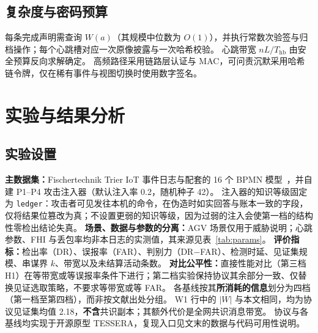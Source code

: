 \documentclass[manuscript,screen,review]{acmart}
\begin{document}
\subsection{复杂度与密码预算}
\label{sec:budget_eng}

每条完成声明需查询 $W(a)$（其规模中位数为 $O(1)$），并执行常数次验签与归档操作；每个心跳槽对应一次原像披露与一次哈希校验。
心跳带宽 $n L/T_{\mathrm{hb}}$ 由安全预算反向求解确定。
高频路径采用链路层认证与 MAC，可问责沉默采用哈希链令牌，仅在稀有事件与视图切换时使用数字签名。

\section{实验与结果分析}
\label{sec:eval}

\subsection{实验设置}
\label{sec:setup}

\textbf{主数据集：}Fischertechnik Trier IoT 事件日志与配套的 16 个 BPMN 模型~\cite{trier2022}，并自建 P1--P4 攻击注入器（默认注入率 0.2，随机种子 42）。
注入器的知识等级固定为 \texttt{ledger}：攻击者可见发往本机的命令，在伪造时如实回答与账本一致的字段，仅将结果位篡改为真；不设置更弱的知识等级，因为过弱的注入会使第一档的结构性零检出结论失真。
\textbf{场景、数据与参数的分离：}AGV 场景仅用于威胁说明；心跳参数、FHI 与丢包率均非本日志的实测值，其来源见表~\ref{tab:params}。
\textbf{评价指标：}检出率（DR）、误报率（FAR）、判别力（DR${-}${FAR}）、检测时延、见证集规模、串谋界 $k$、带宽以及未结算活动条数。
\textbf{对比公平性：}直接性能对比（第三档 H1）在等带宽或等误报率条件下进行；第二档实验保持协议其余部分一致、仅替换见证选取策略，不要求等带宽或等 FAR。
各基线按其\textbf{所消耗的信息}划分为四档（第一档至第四档），而非按文献出处分组。
W1 行中的 $\overline{|W|}$ 与本文相同，均为协议见证集均值 2.18，\textbf{不含}共识副本；其额外代价是全网共识消息带宽。
协议与各基线均实现于开源原型 TESSERA，复现入口见文末的数据与代码可用性说明。
\end{document}

